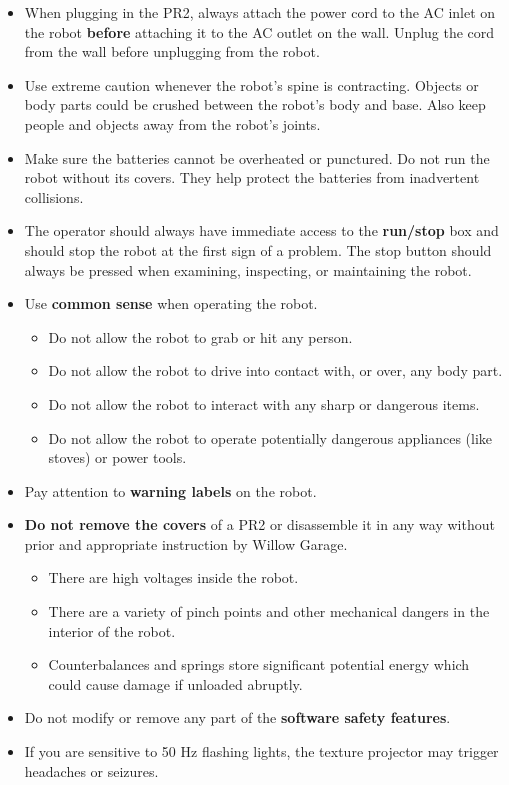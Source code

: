 \begin{itemize}
\begin{itemize}
\end{itemize}
\item When plugging in the PR2, always attach the power cord to the AC inlet on the robot {\bf before} attaching it to the AC outlet on the wall. Unplug the cord from the wall before unplugging from the robot.
\item Use extreme caution whenever the robot's spine is contracting. Objects or body parts could be crushed between the robot's body and base. Also keep people and objects away from the robot's joints.
\item Make sure the batteries cannot be overheated or punctured.  Do not run the robot without its covers. They help protect the batteries from inadvertent collisions.
\item The operator should always have immediate access to the {\bf run/stop} box and should stop the robot at the first sign of a problem. The stop button should always be pressed when examining, inspecting, or maintaining the robot.
\item Use {\bf common sense} when operating the robot.
\begin{itemize}
\item Do not allow the robot to grab or hit any person.
\item Do not allow the robot to drive into contact with, or over, any body part.
\item Do not allow the robot to interact with any sharp or dangerous items.
\item Do not allow the robot to operate potentially dangerous appliances (like stoves) or power tools.
\end{itemize}
\item Pay attention to {\bf warning labels} on the robot.
\item {\bf Do not remove the covers} of a PR2 or disassemble it in any way without prior and appropriate instruction by Willow Garage.
\begin{itemize}
\item There are high voltages inside the robot.
\item There are a variety of pinch points and other mechanical dangers in the interior of the robot.
\item Counterbalances and springs store significant potential energy which could cause damage if unloaded abruptly.
\end{itemize}
\item Do not modify or remove any part of the {\bf software safety features}.
\item If you are sensitive to 50 Hz flashing lights, the texture projector may trigger headaches or seizures.

\end{itemize}
